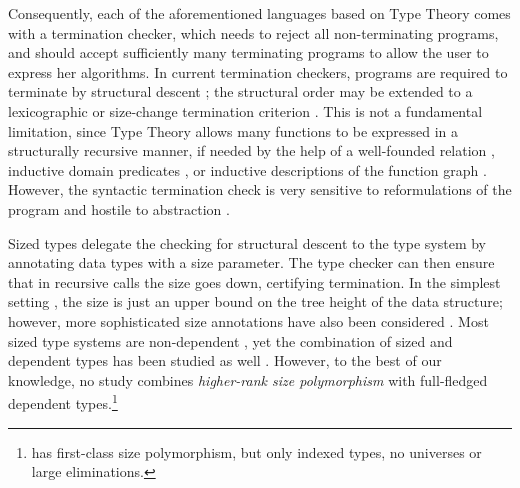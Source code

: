 \documentclass[acmlarge,review,anonymous]{acmart}\settopmatter{printfolios=true}
\begin{document}
Consequently, each of the aforementioned languages based on Type Theory comes with a termination checker, which needs to reject all non-terminating programs, and should accept sufficiently many terminating programs to allow the user to express her algorithms.  In current termination checkers, programs are required to terminate by structural descent \cite{gimenez:guardeddefinitions}; the structural order may be extended to a lexicographic \cite{abelAltenkirch:jfp02} or size-change termination criterion \cite{jones:sizeChange,wahlstedt:PhD}.  This is not a fundamental limitation, since Type Theory allows many functions to be expressed in a structurally recursive manner, if needed by the help of a well-founded relation \cite{nordstrom:genrec}, inductive domain predicates \cite{boveCapretta:mscs05}, or inductive descriptions of the function graph \cite{bove:entcs09}.  However, the syntactic termination check is very sensitive to reformulations of the program and hostile to abstraction \cite{abel:fics12}.

Sized types \cite{hughesParetoSabry:popl96} delegate the checking for structural descent to the type system by annotating data types with a size parameter.  The type checker can then ensure that in recursive calls the size goes down, certifying termination.  In the simplest setting \cite{gimenez:typeBased,abel:lmcs07}, the size is just an upper bound on the tree height of the data structure; however, more sophisticated size annotations have also been considered \cite{xi:terminationHOSC,blanqui:rta04}.  Most sized type systems are non-dependent \cite{amadio:guardcondition,abelPientka:jfp16,bartheGregoireRiba:lernet08,bartheGregoireRiba:csl08,blanquiRiba:lpar06,dalLagoGrellois:probabilisticSizedTypes2017}, yet the combination of sized and dependent types has been studied as well \cite{blanqui:csl05,bartheGregoirePastawski:lpar06,gregoireSacchini:lpar10,sacchini:lics13,sacchini:flops14}.  However, to the best of our knowledge, no study combines \emph{higher-rank size polymorphism} with full-fledged dependent types.\footnote{\citet{xi:terminationHOSC} has first-class size polymorphism, but only indexed types, no universes or large eliminations.}
\end{document}
